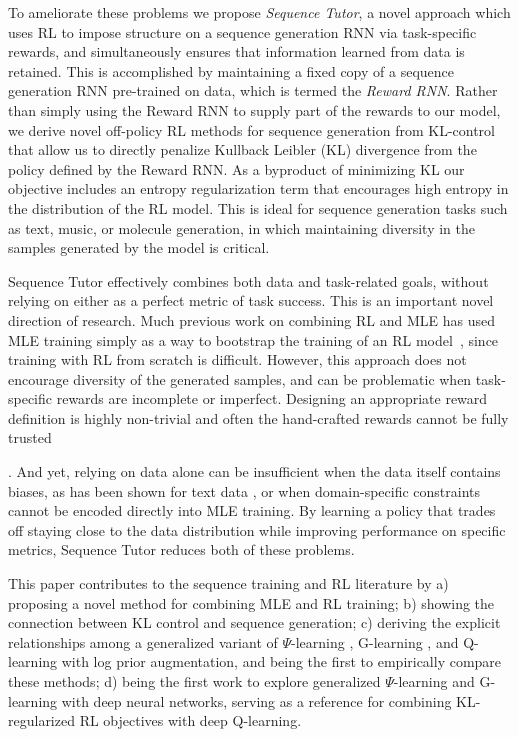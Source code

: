 To ameliorate these problems we propose \emph{Sequence Tutor}, a novel approach which uses RL to impose structure on a sequence generation RNN via task-specific rewards, and simultaneously ensures that information learned from data is retained. This is accomplished by maintaining a fixed copy of a sequence generation RNN pre-trained on data, which is termed the \emph{Reward RNN}. Rather than simply using the Reward RNN to supply part of the rewards to our model, we derive novel off-policy RL methods for sequence generation from KL-control that allow us to directly penalize Kullback Leibler (KL) divergence from the policy defined by the Reward RNN. As a byproduct of minimizing KL our objective includes an entropy regularization term that encourages high entropy in the distribution of the RL model. This is ideal for sequence generation tasks such as text, music, or molecule generation, in which maintaining diversity in the samples generated by the model is critical.   

Sequence Tutor effectively combines both data and task-related goals, without relying on either as a perfect metric of task success. This is an important novel direction of research. Much previous work on combining RL and MLE has used MLE training simply as a way to bootstrap the training of an RL model~\citep{ranzato,bahdanau,li2016deep}, since training with RL from scratch is difficult. However, this approach does not encourage diversity of the generated samples, and can be problematic when task-specific rewards are incomplete or imperfect. Designing an appropriate reward definition is highly non-trivial and often the hand-crafted rewards cannot be fully trusted 

\citep{vedantam2015cider, liu2016not}. And yet, relying on data alone can be insufficient when the data itself contains biases, as has been shown for text data \cite{caliskan2016semantics}, or when domain-specific constraints cannot be encoded directly into MLE training. By learning a policy that trades off staying close to the data distribution while improving performance on specific metrics, Sequence Tutor reduces both of these problems.

This paper contributes to the sequence training and RL literature by a) proposing a novel method for combining MLE and RL training; b) showing the connection between KL control and sequence generation; c) deriving the explicit relationships among a generalized variant of $\Psi$-learning \citep{rawlik2012stochastic}, G-learning \citep{foxtaming}, and Q-learning with log prior augmentation, and being the first to empirically compare these methods; d) being the first work to explore generalized $\Psi$-learning and G-learning with deep neural networks, serving as a reference for combining KL-regularized RL objectives with deep Q-learning.

